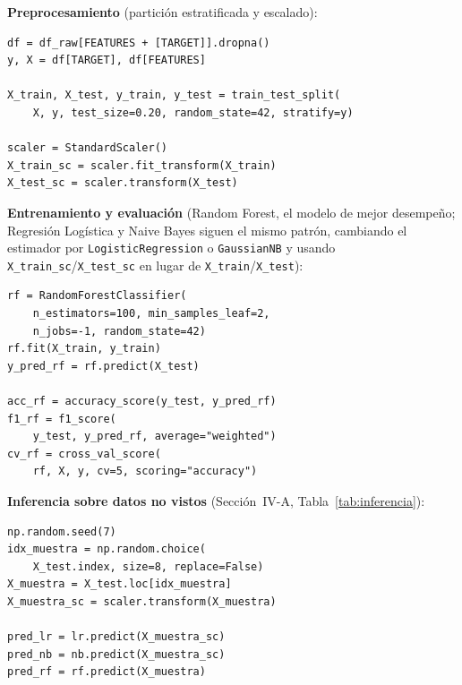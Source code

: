 \documentclass[10pt,journal]{IEEEtran}
\begin{document}
  \textbf{Preprocesamiento} (partici\'on estratificada y escalado):
  \begin{lstlisting}
df = df_raw[FEATURES + [TARGET]].dropna()
y, X = df[TARGET], df[FEATURES]

X_train, X_test, y_train, y_test = train_test_split(
    X, y, test_size=0.20, random_state=42, stratify=y)

scaler = StandardScaler()
X_train_sc = scaler.fit_transform(X_train)
X_test_sc = scaler.transform(X_test)
  \end{lstlisting}

  \textbf{Entrenamiento y evaluaci\'on} (Random Forest, el modelo de mejor desempe\~no; Regresi\'on Log\'istica y Naive Bayes siguen el mismo patr\'on, cambiando el estimador por \texttt{LogisticRegression} o \texttt{GaussianNB} y usando \texttt{X\_train\_sc}/\texttt{X\_test\_sc} en lugar de \texttt{X\_train}/\texttt{X\_test}):
  \begin{lstlisting}
rf = RandomForestClassifier(
    n_estimators=100, min_samples_leaf=2,
    n_jobs=-1, random_state=42)
rf.fit(X_train, y_train)
y_pred_rf = rf.predict(X_test)

acc_rf = accuracy_score(y_test, y_pred_rf)
f1_rf = f1_score(
    y_test, y_pred_rf, average="weighted")
cv_rf = cross_val_score(
    rf, X, y, cv=5, scoring="accuracy")
  \end{lstlisting}

  \textbf{Inferencia sobre datos no vistos} (Secci\'on~IV-A, Tabla~\ref{tab:inferencia}):
  \begin{lstlisting}
np.random.seed(7)
idx_muestra = np.random.choice(
    X_test.index, size=8, replace=False)
X_muestra = X_test.loc[idx_muestra]
X_muestra_sc = scaler.transform(X_muestra)

pred_lr = lr.predict(X_muestra_sc)
pred_nb = nb.predict(X_muestra_sc)
pred_rf = rf.predict(X_muestra)
  \end{lstlisting}

  
  
\end{document}
